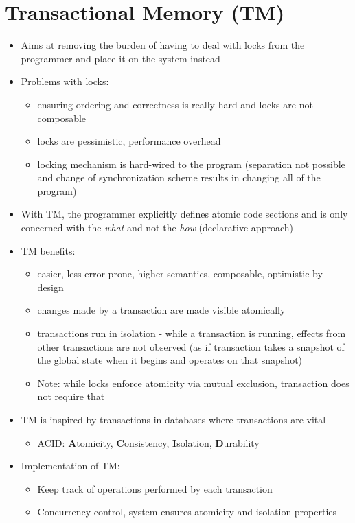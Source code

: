 \documentclass[a4paper]{article}
\begin{document}
\section{Transactional Memory (TM)}
\begin{itemize}
\item Aims at removing the burden of having to deal with locks from the programmer and place it on the system instead
\item Problems with locks: 
\begin{itemize}
\item ensuring ordering and correctness is really hard and locks are not composable
\item locks are pessimistic, performance overhead
\item locking mechanism is hard-wired to the program (separation not possible and change of synchronization scheme results in changing all of the program)
\end{itemize}
\item With TM, the programmer explicitly defines atomic code sections and is only concerned with the \textsl{what} and not the \textsl{how} (declarative approach)
\item TM benefits: 
\begin{itemize}
\item easier, less error-prone, higher semantics, composable, optimistic by design
\item changes made by a transaction are made visible atomically
\item  transactions run in isolation - while a transaction is running, effects from other transactions are not observed (as if transaction takes a snapshot of the global state when it begins and operates on that snapshot)
\item Note: while locks enforce atomicity via mutual exclusion, transaction does not require that
\end{itemize}
\item TM is inspired by transactions in databases where transactions are vital 
\begin{itemize}
\item ACID: \textbf{A}tomicity, \textbf{C}onsistency, \textbf{I}solation, \textbf{D}urability
\end{itemize}
\item Implementation of TM:
\begin{itemize}
\item Keep track of operations performed by each transaction
\item Concurrency control, system ensures atomicity and isolation properties

\end{itemize}
\end{itemize}
\end{document}
